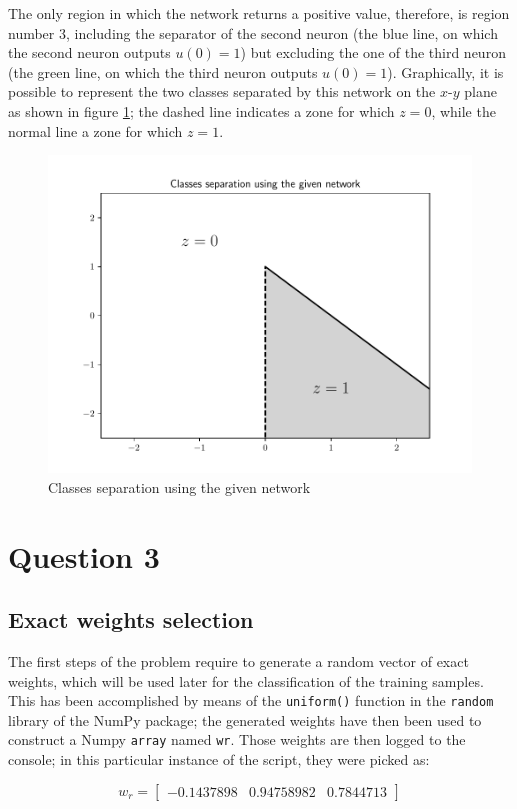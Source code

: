 \documentclass[letterpaper,headings=standardclasses]{scrartcl}
\begin{document}
The only region in which the network returns a positive value, therefore, is region number 3, including the separator of the second neuron (the blue line, on which the second neuron outputs $u(0) = 1$) but excluding the one of the third neuron (the green line, on which the third neuron outputs $u(0) = 1$). Graphically, it is possible to represent the two classes separated by this network on the $x$-$y$ plane as shown in figure \ref{net_sep}; the dashed line indicates a zone for which $z = 0$, while the normal line a zone for which $z = 1$.

\begin{figure}[h]
\centering
\includegraphics[width=0.7\linewidth]{net_sep.pdf}
\caption{Classes separation using the given network}
\label{net_sep}
\end{figure}

\section{Question 3}

\subsection{Exact weights selection}

The first steps of the problem require to generate a random vector of exact weights, which will be used later for the classification of the training samples. This has been accomplished by means of the \texttt{uniform()} function in the \texttt{random} library of the NumPy package; the generated weights have then been used to construct a Numpy \texttt{array} named \texttt{wr}. Those weights are then logged to the console; in this particular instance of the script, they were picked as:

$$ w_r = [\begin{matrix} -0.1437898 & 0.94758982 & 0.7844713 \end{matrix}] $$
\end{document}
